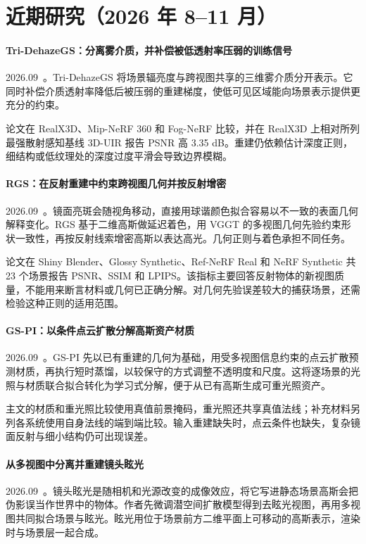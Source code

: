 \section{近期研究（2026 年 8--11 月）}
\paragraph{Tri-DehazeGS：分离雾介质，并补偿被低透射率压弱的训练信号}
2026.09~\cite{2609_11223}。Tri-DehazeGS 将场景辐亮度与跨视图共享的三维雾介质分开表示。它同时补偿介质透射率降低后被压弱的重建梯度，使低可见区域能向场景表示提供更充分的约束。

论文在 RealX3D、Mip-NeRF 360 和 Fog-NeRF 比较，并在 RealX3D 上相对所列最强散射感知基线 3D-UIR 报告 PSNR 高 3.35 dB。重建仍依赖估计深度正则，细结构或低纹理处的深度过度平滑会导致边界模糊。

\paragraph{RGS：在反射重建中约束跨视图几何并按反射增密}
2026.09~\cite{2609_19421}。镜面亮斑会随视角移动，直接用球谐颜色拟合容易以不一致的表面几何解释变化。RGS 基于二维高斯做延迟着色，用 VGGT 的多视图几何先验约束形状一致性，再按反射线索增密高斯以表达高光。几何正则与着色承担不同任务。

论文在 Shiny Blender、Glossy Synthetic、Ref-NeRF Real 和 NeRF Synthetic 共 23 个场景报告 PSNR、SSIM 和 LPIPS。该指标主要回答反射物体的新视图质量，不能用来断言材料或几何已正确分解。对几何先验误差较大的捕获场景，还需检验这种正则的适用范围。

\paragraph{GS-PI：以条件点云扩散分解高斯资产材质}
2026.09~\cite{2609_19907}。GS-PI 先以已有重建的几何为基础，用受多视图信息约束的点云扩散预测材质，再执行短时蒸馏，以较保守的方式调整不透明度和尺度。这将逐场景的光照与材质联合拟合转化为学习式分解，便于从已有高斯生成可重光照资产。

主文的材质和重光照比较使用真值前景掩码，重光照还共享真值法线；补充材料另列各系统使用自身法线的端到端比较。输入重建缺失时，点云条件也缺失，复杂镜面反射与细小结构仍可出现误差。

\paragraph{从多视图中分离并重建镜头眩光}
2026.09~\cite{2609_39527}。镜头眩光是随相机和光源改变的成像效应，将它写进静态场景高斯会把伪影误当作世界中的物体。作者先微调潜空间扩散模型得到去眩光视图，再用多视图共同拟合场景与眩光。眩光用位于场景前方二维平面上可移动的高斯表示，渲染时与场景层一起合成。


